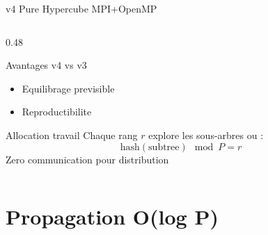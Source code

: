 \documentclass[aspectratio=169,9pt]{beamer}
\begin{document}
\begin{frame}{v4 Pure Hypercube MPI+OpenMP}
\begin{columns}[T]
\begin{column}{0.48\textwidth}
\begin{exampleblock}{Avantages v4 vs v3}
\begin{itemize}
                    \item[$\checkmark$] Equilibrage previsible
                    \item[$\checkmark$] Reproductibilite
                \end{itemize}
            \end{exampleblock}
            \vspace{0.1cm}
            \begin{block}{Allocation travail}
                \small
                Chaque rang $r$ explore les sous-arbres ou :
                \[ \text{hash}(\text{subtree}) \mod P = r \]
                {\footnotesize Zero communication pour distribution}
            \end{block}
        \end{column}
    \end{columns}
\end{frame}

\section{Propagation O(log P)}
\end{document}
